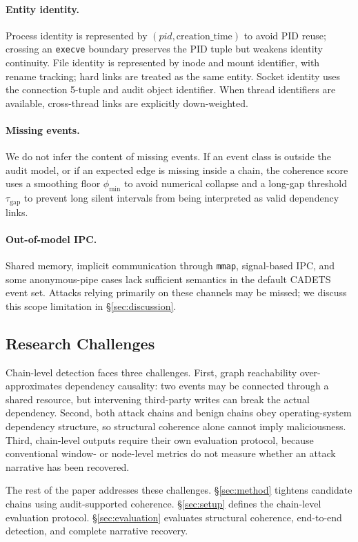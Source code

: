 \paragraph{Entity identity.} Process identity is represented by $(pid,\text{creation\_time})$ to avoid PID reuse; crossing an \texttt{execve} boundary preserves the PID tuple but weakens identity continuity. File identity is represented by inode and mount identifier, with rename tracking; hard links are treated as the same entity. Socket identity uses the connection 5-tuple and audit object identifier. When thread identifiers are available, cross-thread links are explicitly down-weighted.

\paragraph{Missing events.}
\label{sec:audit_missing}
We do not infer the content of missing events. If an event class is outside the audit model, or if an expected edge is missing inside a chain, the coherence score uses a smoothing floor $\phi_{\min}$ to avoid numerical collapse and a long-gap threshold $\tau_{\text{gap}}$ to prevent long silent intervals from being interpreted as valid dependency links.

\paragraph{Out-of-model IPC.}
\label{sec:audit_shm}
Shared memory, implicit communication through \texttt{mmap}, signal-based IPC, and some anonymous-pipe cases lack sufficient semantics in the default CADETS event set. Attacks relying primarily on these channels may be missed; we discuss this scope limitation in \S\ref{sec:discussion}.

\subsection{Research Challenges}

Chain-level detection faces three challenges. First, graph reachability over-approximates dependency causality: two events may be connected through a shared resource, but intervening third-party writes can break the actual dependency. Second, both attack chains and benign chains obey operating-system dependency structure, so structural coherence alone cannot imply maliciousness. Third, chain-level outputs require their own evaluation protocol, because conventional window- or node-level metrics do not measure whether an attack narrative has been recovered.

The rest of the paper addresses these challenges. \S\ref{sec:method} tightens candidate chains using audit-supported coherence. \S\ref{sec:setup} defines the chain-level evaluation protocol. \S\ref{sec:evaluation} evaluates structural coherence, end-to-end detection, and complete narrative recovery.
